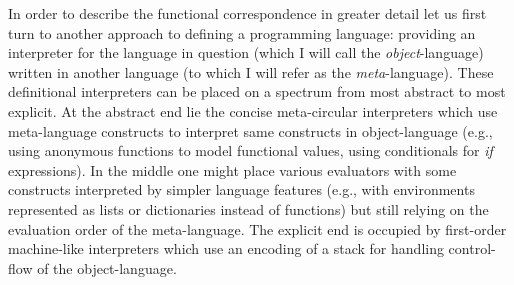 In order to describe the functional correspondence in greater detail let us first turn to another approach to defining a programming language: providing an interpreter for the language in question (which I will call the \emph{object}-language) written in another language (to which I will refer as the \emph{meta}-language).
These definitional interpreters \cite{reynolds} can be placed on a spectrum from most abstract to most explicit.
At the abstract end lie the concise meta-circular interpreters which use meta-language constructs to interpret same constructs in object-language (e.g., using anonymous functions to model functional values, using conditionals for \textit{if} expressions).
In the middle one might place various evaluators with some constructs interpreted by simpler language features (e.g., with environments represented as lists or dictionaries instead of functions) but still relying on the evaluation order of the meta-language.
The explicit end is occupied by first-order machine-like interpreters which use an encoding of a stack for handling control-flow of the object-language.

